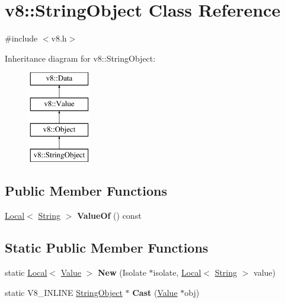 \hypertarget{classv8_1_1StringObject}{}\section{v8\+:\+:String\+Object Class Reference}
\label{classv8_1_1StringObject}


{\ttfamily \#include $<$v8.\+h$>$}

Inheritance diagram for v8\+:\+:String\+Object\+:\begin{figure}[H]
\begin{center}
\leavevmode
\includegraphics[height=4.000000cm]{classv8_1_1StringObject}
\end{center}
\end{figure}
\subsection*{Public Member Functions}
\begin{DoxyCompactItemize}
\item 
\mbox{\label{classv8_1_1StringObject_a6436a958d58c47c4cd38cdf73f72d8dc}} 
\mbox{\hyperlink{classv8_1_1Local}{Local}}$<$ \mbox{\hyperlink{classv8_1_1String}{String}} $>$ {\bfseries Value\+Of} () const
\end{DoxyCompactItemize}
\subsection*{Static Public Member Functions}
\begin{DoxyCompactItemize}
\item 
\mbox{\label{classv8_1_1StringObject_aa8e493bc7d23a6582650474c3d1244c9}} 
static \mbox{\hyperlink{classv8_1_1Local}{Local}}$<$ \mbox{\hyperlink{classv8_1_1Value}{Value}} $>$ {\bfseries New} (Isolate $\ast$isolate, \mbox{\hyperlink{classv8_1_1Local}{Local}}$<$ \mbox{\hyperlink{classv8_1_1String}{String}} $>$ value)
\item 
\mbox{\label{classv8_1_1StringObject_af01249353a4a9032f7791a6e7a4ff094}} 
static V8\+\_\+\+I\+N\+L\+I\+NE \mbox{\hyperlink{classv8_1_1StringObject}{String\+Object}} $\ast$ {\bfseries Cast} (\mbox{\hyperlink{classv8_1_1Value}{Value}} $\ast$obj)
\end{DoxyCompactItemize}


